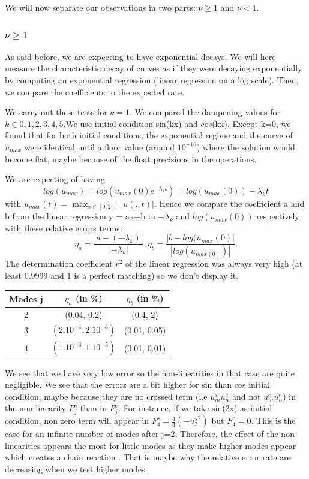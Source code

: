 \documentclass[12pt]{article}
\begin{document}
We will now separate our observations in two parts: $\nu \geq1$ and $\nu <1$.

\subsubsection{$\nu \geq1$}

As said before, we are expecting to have exponential decays. We will here measure the characteristic decay of curves as if they were decaying exponentially by computing an exponential regression (linear regression on a log scale). Then, we compare the coefficients to the expected rate. 

We carry out these tests for $\nu =1$. We compared the dampening values for $k \in {0, 1, 2, 3, 4, 5}.$We use initial condition sin(kx) and cos(kx). Except k=0, we found that for both initial conditions, the exponential regime and the curve of $u_{max}$ were identical until a floor value (around $10^{-16}$) where the solution would become flat, maybe because of the float precisions in the operations.

We are expecting of having $$log(u_{max}) = log(u_{max}(0)e^{-\lambda_k t}) = log(u_{max}(0)) -  \lambda_k t$$ with $u_{max}(t) = \max_{x\in[0,2\pi]}|u(.,t)|.$ Hence we compare the coefficient a and b from the linear regression y = ax+b to $-\lambda_k$ and $log(u_{max}(0))$ respectively with these relative errors terms: $$\eta_a = \frac{|a-(-\lambda_k)|}{|-\lambda_k|}, \eta_b = \frac{|b-log(u_{max}(0)|}{|log(u_{max(0)})|}.$$  The determination coefficient $r^2$ of the linear regression was always very high (at least 0.9999 and 1 is a perfect matching) so we don't display it. 

\begin{center}
\begin{tabular}{ |c|c|c| } 
 \hline
    Modes j  & $\eta_a$ (in \%) & $\eta_b$ (in \%)  \\
 \hline
 2 & (0.04, 0.2) & (0.4, 2) \\ 
 3 & $(2.10^{-4}, 2.10^{-3})$ & (0.01, 0.05) \\ 
 4 & $(1.10^{-6}, 1.10^{-5})$ & (0.01, 0.01) \\ 
 \hline
\end{tabular}
\end{center}

We see that we have very low error so the non-linearities in that case are quite negligible. We see that the errors are a bit higher for sin than cos initial condition, maybe because they are no crossed term (i.e $u_m^s u_n^c$ and not $u_m^c u_n^c$) in  the non linearity $F_j^s$ than in $F_j^s$. For instance, if we take sin(2x) as initial condition, non zero term will appear in $F_4^s=\frac{4}{4}(-{u_2^s}^2)$ but $F_4^c=0$. This is the case for an infinite number of modes after j=2. Therefore, the effect of the non-linearities appears the most for little modes as they make higher modes appear which creates a chain reaction . That is maybe why the relative error rate are decreasing when we test higher modes. 
\end{document}
